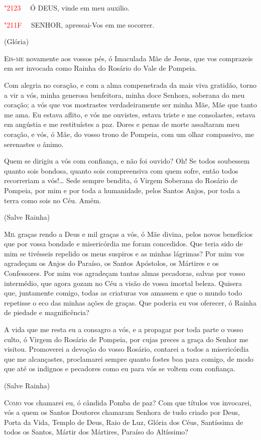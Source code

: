 \documentclass[10pt,twoside,a5paper]{article}
\newcommand{\versic}[1]{
	\textcolor{red}{\char"2123\ }#1
}
\newcommand{\response}[1]{
	\textcolor{red}{\char"211F\ }#1
}
\begin{document}
	\versic\ Ó DEUS, vinde em meu auxilio.
	
	\response\ SENHOR, apressai-Vos em me socorrer.
	
	(Glória)
	
	\lettrine{E}{is-me} novamente aos vossos pés, ó Imaculada Mãe de Jesus, que vos comprazeis em ser invocada como Rainha do Rosário do Vale de Pompeia.
	
	Com alegria no coração, e com a alma compenetrada da mais viva gratidão, torno a vir a vós, minha generosa benfeitora, minha doce Senhora, soberana do meu coração; a vós que vos mostrastes verdadeiramente ser minha Mãe, Mãe que tanto me ama. Eu estava aflito, e vós me ouvistes, estava triste e me consolastes, estava em angústia e me restituístes a paz. Dores e penas de morte assaltaram meu coração, e vós, ó Mãe, do vosso trono de Pompeia, com um olhar compassivo, me serenastes o ânimo.
	
	Quem se dirigiu a vós com confiança, e não foi ouvido? Oh! Se todos soubessem quanto sois bondosa, quanto sois compreensiva com quem sofre, então todos recorreriam a vós!… Sede sempre bendita, ó Virgem Soberana do Rosário de Pompeia, por mim e por toda a humanidade, pelos Santos Anjos, por toda a terra como sois no Céu. Amém.
	
	(Salve Rainha)
	
	\lettrine{M}{il} graças rendo a Deus e mil graças a vós, ó Mãe divina, pelos novos benefícios que por vossa bondade e misericórdia me foram concedidos. Que teria sido de mim se tivésseis repelido os meus suspiros e as minhas lágrimas? Por mim vos agradeçam os Anjos do Paraíso, os Santos Apóstolos, os Mártires e os Confessores. Por mim vos agradeçam tantas almas pecadoras, salvas por vosso intermédio, que agora gozam no Céu a visão de vossa imortal beleza. Quisera que, juntamente comigo, todas as criaturas vos amassem e que o mundo todo repetisse o eco das minhas ações de graças. Que poderia eu vos oferecer, ó Rainha de piedade e magnificência?
	
	A vida que me resta eu a consagro a vós, e a propagar por toda parte o vosso culto, ó Virgem do Rosário de Pompeia, por cujas preces a graça do Senhor me visitou. Promoverei a devoção do vosso Rosário, contarei a todos a misericórdia que me alcançastes, proclamarei sempre quanto fostes boa para comigo, de modo que até os indignos e pecadores como eu para vós se voltem com confiança.
	
	(Salve Rainha)
	
	\lettrine{C}{omo} vos chamarei eu, ó cândida Pomba de paz? Com que títulos vos invocarei, vós a quem os Santos Doutores chamaram Senhora de tudo criado por Deus, Porta da Vida, Templo de Deus, Raio de Luz, Glória dos Céus, Santíssima de todos os Santos, Mártir dos Mártires, Paraíso do Altíssimo?
	
\end{document}
